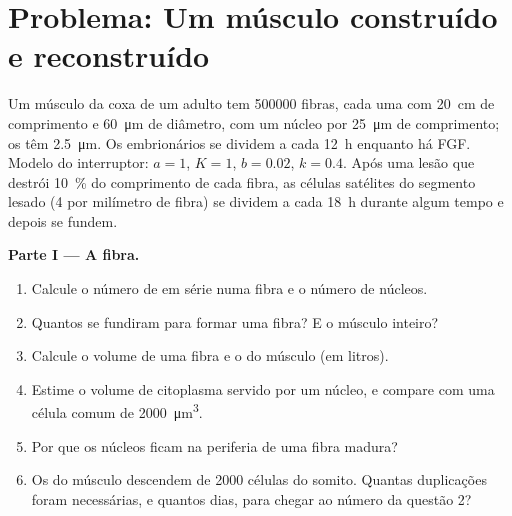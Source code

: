 \section{Problema: Um músculo construído e reconstruído}

\begin{problem}
\label{pb:b2:cell-differentiation:1}
Um músculo da coxa de um adulto tem \num{500000} fibras, cada uma com
\qty{20}{cm} de comprimento e \qty{60}{\micro m} de diâmetro, com um
núcleo por \qty{25}{\micro m} de comprimento; os  têm
\qty{2.5}{\micro m}. Os  embrionários se dividem a cada
\qty{12}{h} enquanto há FGF. Modelo do interruptor: $a = 1$, $K = 1$,
$b = 0.02$, $k
= 0.4$. Após uma lesão que destrói \qty{10}{\%} do comprimento de cada
fibra, as células satélites do segmento lesado (\num{4} por milímetro
de fibra) se dividem a cada \qty{18}{h} durante algum tempo e depois
se fundem.

\medskip
\noindent\textbf{Parte I --- A fibra.}
\begin{enumerate}
  \item Calcule o número de  em série numa fibra e o número de
        núcleos.
  \item Quantos  se fundiram para formar uma fibra? E o
        músculo inteiro?
  \item Calcule o volume de uma fibra e o do músculo (em litros).
  \item Estime o volume de citoplasma servido por um núcleo, e compare
        com uma célula comum de \qty{2000}{\micro m^3}.
  \item Por que os núcleos ficam na periferia de uma fibra madura?
  \item Os  do músculo descendem de \num{2000} células do
        somito. Quantas duplicações foram necessárias, e quantos dias,
        para chegar ao número da questão 2?
\end{enumerate}


\end{problem}

